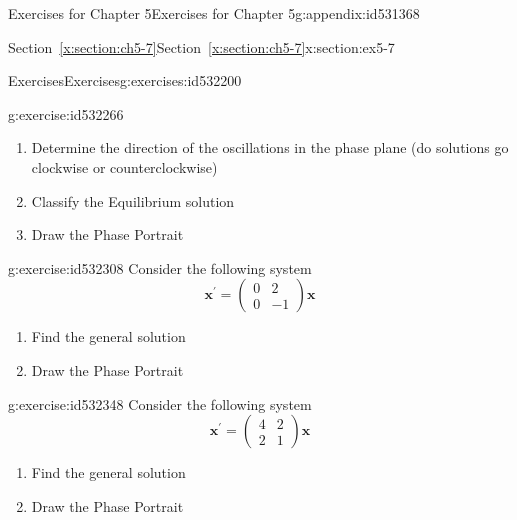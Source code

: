 \documentclass[oneside,10pt,]{book}
\newcommand{\xreffont}{\relax}
\numberwithin{equation}{section}
\numberwithin{equation}{section}
\newcommand{\amp}{&}
\begin{document}
\begin{appendixptx}{Exercises for Chapter 5}{}{Exercises for Chapter 5}{}{}{g:appendix:id531368}
\begin{sectionptx}{Section~{\xreffont\ref*{x:section:ch5-7}}}{}{Section~{\xreffont\ref*{x:section:ch5-7}}}{}{}{x:section:ex5-7}
\begin{exercises-subsection-numberless}{Exercises}{}{Exercises}{}{}{g:exercises:id532200}
\begin{divisionexercise}{2}{}{}{g:exercise:id532266}
\begin{enumerate}[label=(\alph*)]
\begin{equation*}
\begin{array}{cc}
-2 \amp -1\\
1 \amp -4
\end{array}\right)\mathbf{x},\,\,\,\,\,\mathbf{x}(0)=\left(\begin{array}{c}
-1\\
3
\end{array}\right)
\end{equation*}
%
\item{}Determine the direction of the oscillations in the phase plane (do solutions go clockwise or counterclockwise)%
\item{}Classify the Equilibrium solution%
\item{}Draw the Phase Portrait%
\end{enumerate}
\end{divisionexercise}%
\begin{divisionexercise}{3}{}{}{g:exercise:id532308}%
Consider the following system%
\begin{equation*}
\mathbf{x}^{\prime}=\left(\begin{array}{cc}
0 \amp 2\\
0 \amp -1
\end{array}\right)\mathbf{x}
\end{equation*}
%
%
\begin{enumerate}[label=(\alph*)]
\item{}Find the general solution%
\item{}Draw the Phase Portrait%
\end{enumerate}
\end{divisionexercise}%
\begin{divisionexercise}{4}{}{}{g:exercise:id532348}%
Consider the following system%
\begin{equation*}
\mathbf{x}^{\prime}=\left(\begin{array}{cc}
4 \amp 2\\
2 \amp 1
\end{array}\right)\mathbf{x}
\end{equation*}
%
%
\begin{enumerate}[label=(\alph*)]
\item{}Find the general solution%
\item{}Draw the Phase Portrait%
\end{enumerate}
\end{divisionexercise}%
\end{exercises-subsection-numberless}
\end{sectionptx}
\end{appendixptx}
\end{document}
